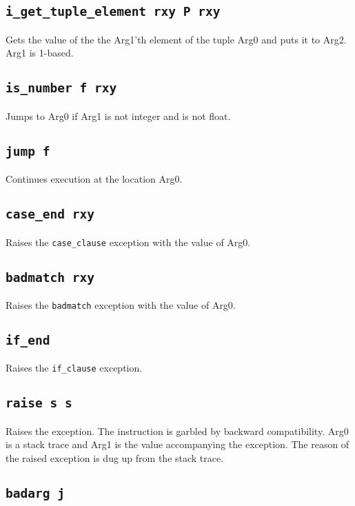 \documentclass{article}
\newcommand{\iop}[1]{\texttt{#1}}
\begin{document}
\subsection*{\iop{i\_get\_tuple\_element rxy P rxy}}

Gets the value of the the Arg1'th element of the tuple Arg0 and puts it to Arg2.
Arg1 is 1-based.

\subsection*{\iop{is\_number f rxy}}

Jumps to Arg0 if Arg1 is not integer and is not float.

\subsection*{\iop{jump f}}

Continues execution at the location Arg0.

\subsection*{\iop{case\_end rxy}}

Raises the \verb$case_clause$ exception with the value of Arg0.

\subsection*{\iop{badmatch rxy}}

Raises the \verb$badmatch$ exception with the value of Arg0.

\subsection*{\iop{if\_end}}

Raises the \verb$if_clause$ exception.

\subsection*{\iop{raise s s}}

Raises the exception. The instruction is garbled by backward compatibility. Arg0
is a stack trace and Arg1 is the value accompanying the exception. The reason of
the raised exception is dug up from the stack trace. 

\subsection*{\iop{badarg j}}
\end{document}
